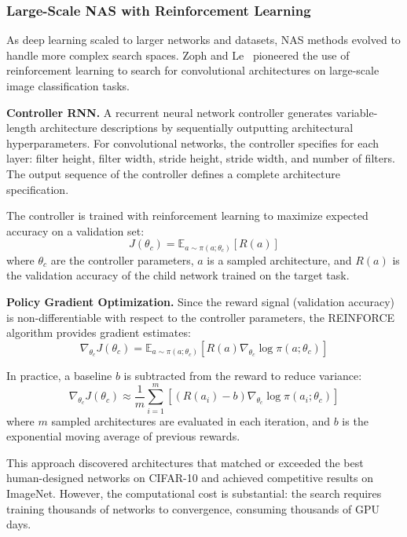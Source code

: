\subsubsection{Large-Scale NAS with Reinforcement Learning}

As deep learning scaled to larger networks and datasets, NAS methods evolved to handle more complex search spaces. Zoph and Le~\cite{zoph2017neural} pioneered the use of reinforcement learning to search for convolutional architectures on large-scale image classification tasks.

\textbf{Controller RNN.} A recurrent neural network controller generates variable-length architecture descriptions by sequentially outputting architectural hyperparameters. For convolutional networks, the controller specifies for each layer: filter height, filter width, stride height, stride width, and number of filters. The output sequence of the controller defines a complete architecture specification.

The controller is trained with reinforcement learning to maximize expected accuracy on a validation set:
\begin{equation}
J(\theta_c) = \mathbb{E}_{a \sim \pi(a;\theta_c)}[R(a)]
\end{equation}
where $\theta_c$ are the controller parameters, $a$ is a sampled architecture, and $R(a)$ is the validation accuracy of the child network trained on the target task.

\textbf{Policy Gradient Optimization.} Since the reward signal (validation accuracy) is non-differentiable with respect to the controller parameters, the REINFORCE algorithm provides gradient estimates:
\begin{equation}
\nabla_{\theta_c} J(\theta_c) = \mathbb{E}_{a \sim \pi(a;\theta_c)}[R(a) \nabla_{\theta_c} \log \pi(a;\theta_c)]
\end{equation}

In practice, a baseline $b$ is subtracted from the reward to reduce variance:
\begin{equation}
\nabla_{\theta_c} J(\theta_c) \approx \frac{1}{m}\sum_{i=1}^m [(R(a_i) - b) \nabla_{\theta_c} \log \pi(a_i;\theta_c)]
\end{equation}
where $m$ sampled architectures are evaluated in each iteration, and $b$ is the exponential moving average of previous rewards.

This approach discovered architectures that matched or exceeded the best human-designed networks on CIFAR-10 and achieved competitive results on ImageNet. However, the computational cost is substantial: the search requires training thousands of networks to convergence, consuming thousands of GPU days.

